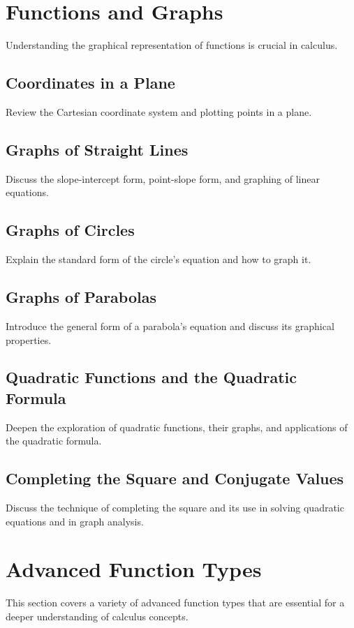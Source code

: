 \documentclass[a4paper,12pt]{book}
\begin{document}
\section{Functions and Graphs}
\label{sec:functions_and_graphs}
Understanding the graphical representation of functions is crucial in calculus.


\subsection{Coordinates in a Plane}
\label{subsec:coordinates_in_a_plane}
Review the Cartesian coordinate system and plotting points in a plane.


\subsection{Graphs of Straight Lines}
\label{subsec:graphs_of_straight_lines}
Discuss the slope-intercept form, point-slope form, and graphing of linear equations.


\subsection{Graphs of Circles}
\label{subsec:graphs_of_circles}
Explain the standard form of the circle's equation and how to graph it.


\subsection{Graphs of Parabolas}
\label{subsec:graphs_of_parabolas}
Introduce the general form of a parabola's equation and discuss its graphical properties.


\subsection{Quadratic Functions and the Quadratic Formula}
\label{subsec:quadratic_functions_formula}
Deepen the exploration of quadratic functions, their graphs, and applications of the quadratic formula.


\subsection{Completing the Square and Conjugate Values}
\label{subsec:completing_square_conjugate_values}
Discuss the technique of completing the square and its use in solving quadratic equations and in graph analysis.


\section{Advanced Function Types}
\label{sec:advanced_function_types}
This section covers a variety of advanced function types that are essential for a deeper understanding of calculus concepts.
\end{document}
